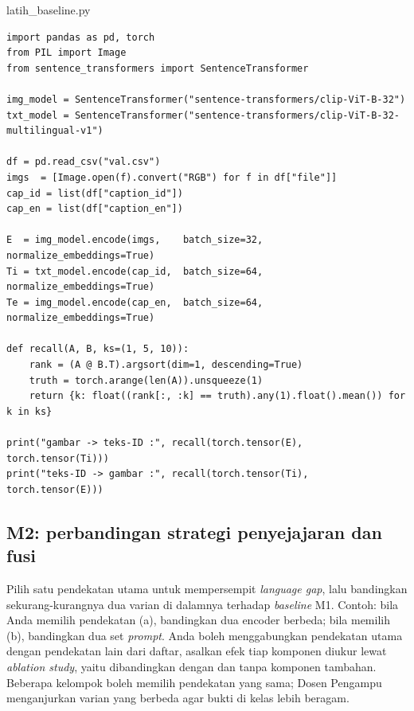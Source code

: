 \documentclass[12pt, a4paper]{article}
\begin{document}
\begin{codewindow}{latih\_baseline.py}
\begin{lstlisting}[style=pycode]
import pandas as pd, torch
from PIL import Image
from sentence_transformers import SentenceTransformer

img_model = SentenceTransformer("sentence-transformers/clip-ViT-B-32")
txt_model = SentenceTransformer("sentence-transformers/clip-ViT-B-32-multilingual-v1")

df = pd.read_csv("val.csv")
imgs  = [Image.open(f).convert("RGB") for f in df["file"]]
cap_id = list(df["caption_id"])
cap_en = list(df["caption_en"])

E  = img_model.encode(imgs,    batch_size=32, normalize_embeddings=True)
Ti = txt_model.encode(cap_id,  batch_size=64, normalize_embeddings=True)
Te = img_model.encode(cap_en,  batch_size=64, normalize_embeddings=True)

def recall(A, B, ks=(1, 5, 10)):
    rank = (A @ B.T).argsort(dim=1, descending=True)
    truth = torch.arange(len(A)).unsqueeze(1)
    return {k: float((rank[:, :k] == truth).any(1).float().mean()) for k in ks}

print("gambar -> teks-ID :", recall(torch.tensor(E), torch.tensor(Ti)))
print("teks-ID -> gambar :", recall(torch.tensor(Ti), torch.tensor(E)))
\end{lstlisting}
\end{codewindow}

\subsection{M2: perbandingan strategi penyejajaran dan fusi}

Pilih satu pendekatan utama untuk mempersempit \emph{language gap}, lalu bandingkan sekurang-kurangnya dua varian di dalamnya terhadap \emph{baseline} M1. Contoh: bila Anda memilih pendekatan (a), bandingkan dua encoder berbeda; bila memilih (b), bandingkan dua set \emph{prompt}. Anda boleh menggabungkan pendekatan utama dengan pendekatan lain dari daftar, asalkan efek tiap komponen diukur lewat \emph{ablation study}, yaitu dibandingkan dengan dan tanpa komponen tambahan. Beberapa kelompok boleh memilih pendekatan yang sama; Dosen Pengampu menganjurkan varian yang berbeda agar bukti di kelas lebih beragam.
\end{document}
